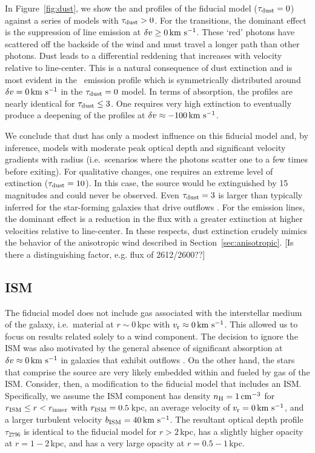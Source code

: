 \documentclass[12pt,preprint]{aastex}
\begin{document}
In Figure~\ref{fig:dust}, we show the  and 
profiles of the fiducial model ($\tau_{\rm dust} = 0$) against a series of
models with $\tau_{\rm dust} > 0$.  For the  transitions, the
dominant effect is the suppression of line emission at $\delta v \ge 0
\, {\rm km~s^{-1}}$.  These `red' photons have scattered off the
backside of the wind and must travel a longer path than other
photons.  Dust leads to a differential reddening that increases with 
velocity relative to line-center. This is a natural consequence of dust
extinction and is most evident in the \feiic\ 
emission profile which is symmetrically distributed around
$\delta v= 0 \, {\rm km~s^{-1}}$ in the $\tau_{\rm dust}=0$ model.   In terms of absorption, the profiles are
nearly identical for $\tau_{\rm dust} \le 3$.  One requires very high
extinction to eventually produce a deepening of the profiles at 
$\delta v \approx -100 \, {\rm km~s^{-1}}$.

We conclude that dust has only a modest influence on this fiducial model and,
by inference, models with moderate peak optical depth and
significant velocity gradients with radius (i.e.\ scenarios where the
photons scatter one to a few times before exiting).
For qualitative changes, one requires an extreme level of
extinction ($\tau_{\rm dust} = 10$).  In this case, the source would be
extinguished by 15\,magnitudes and could never be observed. 
Even $\tau_{\rm dust} = 3$ is larger than typically inferred for the
star-forming galaxies that drive outflows \citep[e.g.][]{dust}.
For the emission lines,
the dominant effect is a reduction in the flux 
with a greater extinction at higher velocities relative to line-center.
In these respects, dust extinction crudely mimics the behavior of the
anisotropic
wind described in Section~\ref{sec:anisotropic}. [Is there a
distinguishing factor, e.g. flux of 2612/2600??]


\subsection{ISM}
\label{sec:ISM}

The fiducial model does not include gas associated with
the interstellar medium of the galaxy, i.e.\ material at $r \sim
0$\,kpc with $v_{\rm r} \approx 0 \, {\rm km~s^{-1}}$.  This allowed us to focus on
results related solely to a wind component.  The decision to ignore the ISM
was also motivated by the general absence of significant absorption at
$\delta v \approx 0 \, {\rm km~s^{-1}}$ in galaxies that exhibit outflows 
\citep[e.g.][]{wcp+09,rwk+10,steidel+10}.
On the other hand, the stars that comprise the
source are very likely embedded within and fueled by gas
of the ISM.  
Consider, then, a modification to the fiducial model that 
includes an ISM. 
Specifically, we assume the ISM component has density $n_{\rm H} = 1 \, {\rm cm^{-3}}$ for
$r_{\rm ISM} \le r < r_{\rm inner}$ with $r_{\rm ISM} = 0.5$\,kpc, 
an average velocity of $v_{\rm r} = 0 \, {\rm km~s^{-1}}$, and a larger turbulent velocity $b_{\rm ISM} = 40 \, {\rm km~s^{-1}}$.
The resultant optical depth profile $\tau_{2796}$ is identical to the
fiducial model for $r > 2$\,kpc, has a slightly higher opacity at
$r=1-2$\,kpc, and has a very large opacity at $r = 0.5-1$\,kpc.
\end{document}
